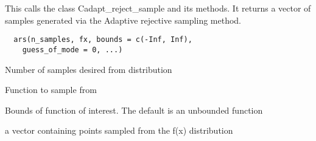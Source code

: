 \documentclass[a4paper]{book}
\begin{document}
%
\begin{Description}\relax
This calls the class Cadapt\_reject\_sample and its
methods.  It returns a vector of samples generated via
the Adaptive rejective sampling method.
\end{Description}
%
\begin{Usage}
\begin{verbatim}
  ars(n_samples, fx, bounds = c(-Inf, Inf),
    guess_of_mode = 0, ...)
\end{verbatim}
\end{Usage}
%
\begin{Arguments}
\begin{ldescription}
\item[\code{n\_samples:}] Number of samples desired from
distribution

\item[\code{fx:}] Function to sample from

\item[\code{bounds:}] Bounds of function of interest.  The
default is an unbounded function
\end{ldescription}
\end{Arguments}
%
\begin{Value}
a vector containing  points sampled from the f(x)
distribution
\end{Value}
\end{document}
